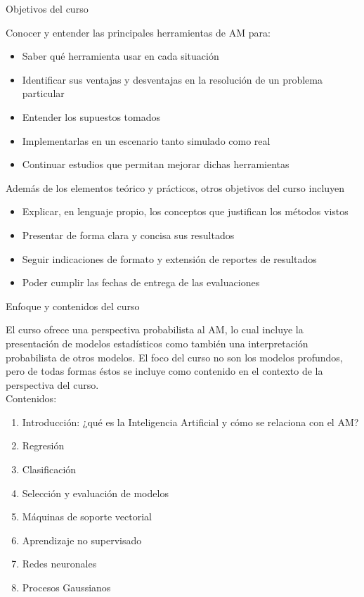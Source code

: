 \documentclass[9pt]{beamer}
\begin{document}
\begin{frame}{Objetivos del curso}

 Conocer y entender las principales herramientas de AM para: 


\begin{itemize}
  \item Saber qué herramienta usar en cada situación 
  \item Identificar sus  ventajas y desventajas en la resolución de un problema particular
  \item Entender los supuestos tomados
  \item Implementarlas en un escenario tanto simulado como real
  \item Continuar estudios que permitan mejorar dichas herramientas 
\end{itemize}
\vfill

Además de los elementos teórico y prácticos, otros objetivos del curso incluyen

 \begin{itemize}
  \item Explicar, en lenguaje propio, los conceptos que justifican los métodos vistos  
  \item Presentar de forma clara y concisa sus resultados 
  \item Seguir indicaciones de formato y extensión de reportes de resultados
  \item Poder cumplir las fechas de entrega de las evaluaciones
\end{itemize}

\end{frame}


\begin{frame}{Enfoque y contenidos del curso}

El curso ofrece una perspectiva probabilista al AM, lo cual incluye la presentación de modelos estadísticos como también una interpretación probabilista de otros modelos. El foco del curso no son los modelos profundos, pero de todas formas éstos se incluye como contenido en el contexto de la perspectiva del curso.\\
\vspace{2em}
Contenidos:

\begin{enumerate}
  \item Introducción: ¿qué es la Inteligencia Artificial y cómo se relaciona con el AM? 
  \item Regresión
  \item Clasificación
  \item Selección y evaluación de modelos
  \item Máquinas de soporte vectorial
  \item Aprendizaje no supervisado
  \item Redes neuronales
  \item Procesos Gaussianos 
\end{enumerate}
\vfill


\end{frame}
\end{document}
